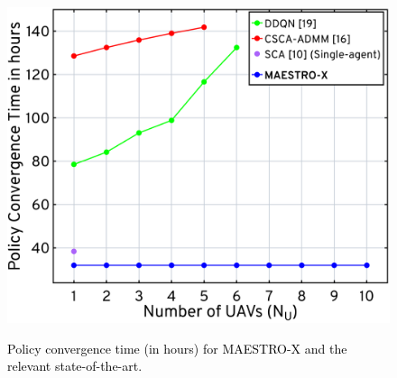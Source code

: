 \documentclass[10pt, twocolumn]{IEEEtran}
\theoremstyle{plain}
\theoremstyle{definition}
\theoremstyle{remark}
\newcommand\hlt[1]{\textcolor{black}{#1}}
\begin{document}
{\begin{figure}[t]
\begin{minipage}[b]{0.51\linewidth}
	\centering
	\includegraphics[width=1.0\linewidth]{figs/Policy_Convergence.jpg}
	\caption{\hlt{Policy convergence time (in hours) for MAESTRO-X and the relevant state-of-the-art.}}
    \vspace{-6mm}
	\label{F10}
\end{minipage}
\end{figure}

}
\end{document}
